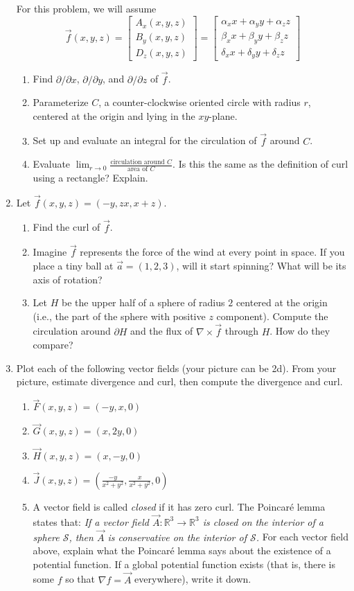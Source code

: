 \documentclass[letter]{article}
\newcommand{\R}{\mathbb{R}}
\newcommand{\mat}[1]{\begin{bmatrix}#1\end{bmatrix}}
\begin{document}
\begin{enumerate}
			For this problem, we will assume
			\[
				\vec f(x,y,z) = \mat{A_x(x,y,z)\\B_y(x,y,z)\\D_z(x,y,z)} = \mat{\alpha_xx+\alpha_yy+\alpha_zz\\
				\beta_xx+\beta_yy+\beta_zz\\\delta_xx+\delta_yy+\delta_zz}
			\]
			\begin{enumerate}
				\item Find $\partial/\partial x$, $\partial/\partial y$, and $\partial/\partial z$ of $\vec f$.
				\item Parameterize $C$, a counter-clockwise oriented circle with radius $r$, centered at the origin 
					and lying in the $xy$-plane.
				\item Set up and evaluate an integral for the circulation of $\vec f$ around $C$.
				\item Evaluate $\displaystyle\lim_{r\to 0} \frac{\text{circulation around $C$}}{\text{area of $C$}}$.  Is
					this the same as the definition of curl using a rectangle?  Explain.
			\end{enumerate}

		\item Let $\vec f(x,y,z) = (-y,zx,x+z)$.
			\begin{enumerate}
				\item Find the curl of $\vec f$.
				\item Imagine $\vec f$ represents the force of the wind at
					every point in space.  If you place a tiny ball at $\vec a=(1,2,3)$,  
					will it start spinning?  What will be its axis of rotation?
				\item Let $H$ be the upper half of a sphere of radius $2$ centered
					at the origin (i.e., the part of the sphere with positive $z$ component). 
					Compute the circulation around $\partial H$ and the flux of $\nabla \times \vec f$
					through $H$.  How do they compare?
			\end{enumerate}
		\item Plot each of the following vector fields (your picture can be 2d).  
			From your picture, estimate divergence and curl, then compute
			the divergence and curl.
			\begin{enumerate}
				\item $\vec F(x,y,z) = (-y,x,0)$
				\item $\vec G(x,y,z) = (x,2y,0)$
				\item $\vec H(x,y,z) = (x,-y,0)$
				\item $\vec J(x,y,z) = (\frac{-y}{x^2+y^2}, \frac{x}{x^2+y^2}, 0)$
				\item A vector field is called \emph{closed} if it has zero curl.  The Poincar\'e
					lemma states that: \emph{If a vector field $\vec A:\R^3\to\R^3$ is closed
					on the interior of a sphere $\mathcal S$, then $\vec A$ is conservative 
					on the interior of $\mathcal S$.}  For each vector field above, explain 
					what the Poincar\'e lemma says about the existence of a potential function.
					If a global potential function exists (that is, there is some $f$
					so that $\nabla f = \vec A$ everywhere), write it down.  
					

\end{enumerate}
\end{enumerate}
\end{document}
